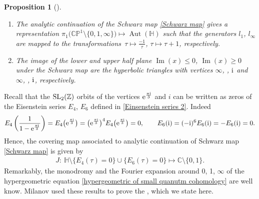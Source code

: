 \documentclass[11pt]{article}
\numberwithin{equation}{section}
\numberwithin{equation}{section}
\newtheorem{Proposition}[Theorem]{Proposition}
 { \theoremstyle{definition}
\newtheorem{Definition}[Theorem]{Definition}
\newtheorem{Remark}[Theorem]{Remark} }
\begin{document}
\begin{Proposition}[{\cite{Milanov}}]\label{Milanov lemma small 1}\quad
\begin{enumerate}\itemsep=0pt
\item[$(1)$]
The analytic continuation of the Schwarz map \eqref{Schwarz map} gives a representation
$\pi_1\bigl(\mathbb{CP}^1\setminus\{0,1,\infty\}\bigr)\mapsto \operatorname{Aut}(\mathbb{H})$
such that the generators $l_1$, $l_{\infty}$ are mapped to the transformations~${
\tau\mapsto \frac{-1}{\tau}}$, $ \tau\mapsto \tau+1$,
respectively.
\item[$(2)$] The image of the lower and upper half plane $\operatorname{Im}(x)\leq 0$, $\operatorname{Im}(x)\geq 0$ under the Schwarz map are the hyperbolic triangles with vertices $\infty$, , ${\rm i}$ and $\infty$, , ${\rm i}$, respectively.
\end{enumerate}
\end{Proposition}

Recall that the ${\rm SL}_2(\mathbb{Z})$ orbits of the vertices ${\rm e}^{\frac{\pi {\rm i}}{3}}$ and $i$ can be written as zeros of the Eisenstein series $E_4$, $E_6$ defined in \eqref{Einsenstein series 2}. Indeed
\begin{gather*}
E_4\left(\frac{1}{1-{\rm e}^{\frac{\pi {\rm i}}{3}} }\right)=E_4\bigl({\rm e}^{\frac{\pi {\rm i}}{3}}\bigr)=\bigl({\rm e}^{\frac{\pi {\rm i}}{3}}\bigr)^4E_4\bigl({\rm e}^{\frac{\pi {\rm i}}{3}}\bigr)=0,\qquad
E_6({\rm i})=(-{\rm i})^6E_6({\rm i})=-E_6({\rm i})=0.
\end{gather*}
Hence, the covering map associated to analytic continuation of Schwarz map \eqref{Schwarz map} is given by
\begin{gather}\label{function J covering definition}
J\colon\ \mathbb{H}\setminus\{E_4(\tau)=0\}\cup\{E_6(\tau)=0\}\mapsto \mathbb{C}\setminus\{0,1\}.
\end{gather}
Remarkably, the monodromy and the Fourier expansion around 0, 1, $\infty$ of the hypergeometric equation \eqref{hypergeometric of small quanutm cohomology} are well know. Milanov used these results to prove the \cite[Lemma 4.3]{Milanov}, which we state here.
\end{document}

